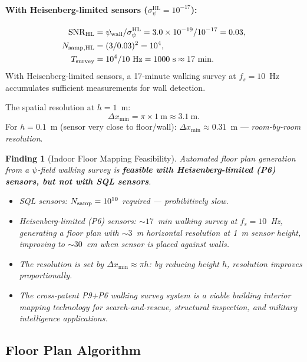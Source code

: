 \documentclass[aps,prd,twocolumn,superscriptaddress,nofootinbib]{revtex4-2}
\newcommand{\HL}{\mathrm{HL}}
\newtheorem{finding}{Finding}
\begin{document}
\paragraph{With Heisenberg-limited sensors ($\sigma_\psi^{\HL} = 10^{-17}$):}
\begin{align}
  \mathrm{SNR}_{\rm HL} &= \psi_{\rm wall}/\sigma_\psi^{\HL}
  = 3.0\times10^{-19}/10^{-17} = 0.03, \\
  N_{\rm samp,HL} &= (3/0.03)^2 = 10^4, \\
  T_{\rm survey} &= 10^4/10~\mathrm{Hz} = 1000~\mathrm{s}
  \approx 17~\mathrm{min}.
\end{align}
With Heisenberg-limited sensors, a 17-minute walking survey at $f_s = 10$~Hz
accumulates sufficient measurements for wall detection.

The spatial resolution at $h = 1$~m:
\begin{equation}
  \Delta x_{\min} = \pi \times 1~\mathrm{m} \approx 3.1~\mathrm{m}.
  \label{eq:resolution-indoor}
\end{equation}
For $h = 0.1$~m (sensor very close to floor/wall):
$\Delta x_{\min} \approx 0.31$~m --- \emph{room-by-room resolution}.

\begin{finding}[Indoor Floor Mapping Feasibility]
\label{find:floor-mapping}
Automated floor plan generation from a $\psi$-field walking survey is
\textbf{feasible with Heisenberg-limited (P6) sensors, but not with SQL
sensors}.
\begin{itemize}
  \item SQL sensors: $N_{\rm samp} = 10^{10}$ required --- prohibitively slow.
  \item Heisenberg-limited (P6) sensors: $\sim 17$~min walking survey
    at $f_s = 10$~Hz, generating a floor plan with $\sim 3$~m horizontal
    resolution at 1~m sensor height, improving to $\sim 30$~cm when
    sensor is placed against walls.
  \item The resolution is set by $\Delta x_{\min} \approx \pi h$: by
    reducing height $h$, resolution improves proportionally.
  \item The cross-patent P9+P6 walking survey system is a viable
    building interior mapping technology for search-and-rescue,
    structural inspection, and military intelligence applications.
\end{itemize}
\end{finding}

\subsection{Floor Plan Algorithm}
\end{document}

